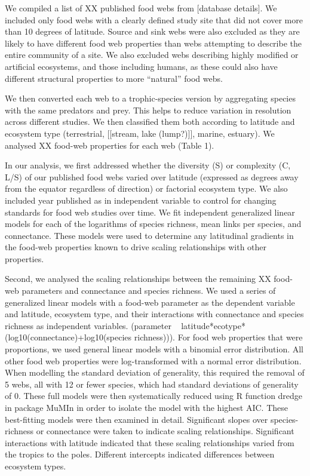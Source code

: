 We compiled a list of XX published food webs from [database details]. We
included only food webs with a clearly defined study site that did not cover
more than 10 degrees of latitude. Source and sink webs were also excluded as
they are likely to have different food web properties than webs attempting to
describe the entire community of a site. We also excluded webs describing highly
modified or artificial ecosystems, and those including humans, as these could also
have different structural properties to more ``natural'' food webs.


We then converted each web to a trophic-species version by aggregating species
with the same predators and prey. This helps to reduce variation in resolution
across different studies. We then classified them both according to latitude
and ecosystem type (terrestrial, [[stream, lake (lump?)]], marine, estuary). We analysed XX
food-web properties for each web (Table 1).


In our analysis, we first addressed whether the diversity (S) or complexity (C, L/S) of our
published food webs varied over latitude (expressed as degrees away from the
equator regardless of direction) or factorial ecosystem type. We also included
year published as in independent variable to control for changing standards
for food web studies over time. We fit independent generalized linear models
for each of the logarithms of species richness, mean links per species, and
connectance. These models were used to determine any latitudinal gradients in the food-web
properties known to drive scaling relationships with other properties.


Second, we analysed the scaling relationships between the remaining XX food-
web parameters and connectance and species richness. We used a series of
generalized linear models with a food-web parameter as the dependent variable
and latitude, ecosystem type, and their interactions with connectance and
species richness as independent variables. (parameter ~
latitude*ecotype*(log10(connectance)+log10(species richness))). For food web
properties that were proportions, we used general linear models with a
binomial error distribution. All other food web properties were log-transformed with a normal error distribution.
When modelling the standard deviation of generality, this
required the removal of 5 webs, all with 12 or fewer species, which had
standard deviations of generality of 0. These full models were then
systematically reduced using R function dredge \cite{} in package MuMIn
\cite{} in order to isolate the model with the highest AIC. These best-fitting models were 
then examined in detail. Significant slopes over species-richness or connectance were taken to indicate scaling
relationships. Significant interactions with latitude indicated that these scaling relationships varied from the tropics
to the poles. Different intercepts indicated differences between ecosystem types.



